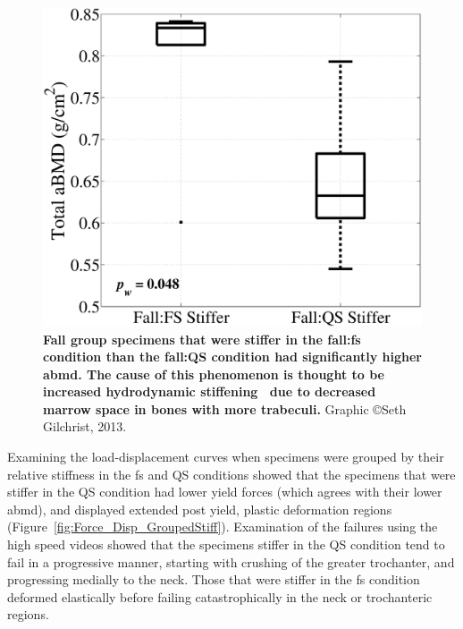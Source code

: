 \begin{figure}
\centering
\includegraphics[width=\linewidth]{./behave_fail/Figures/DXA_DeltaStiff}
\caption[\acs*{abmd} grouped by relative stiffness]{\textbf{Fall group specimens that were stiffer in the fall:\ac{fs} condition than the fall:\ac{QS} condition had significantly higher \ac{abmd}. The cause of this phenomenon is thought to be increased hydrodynamic stiffening~\citep{carter_compressive_1977} due to decreased marrow space in bones with more trabeculi.} Graphic \copyright Seth Gilchrist, 2013.}
\label{fig:DXA_DeltaStiff}
\end{figure}

Examining the load-displacement curves when specimens were grouped by their relative stiffness in the \ac{fs} and \ac{QS} conditions showed that the specimens that were stiffer in the \ac{QS} condition had lower yield forces (which agrees with their lower \ac{abmd}), and displayed extended post yield, plastic deformation regions (Figure~\ref{fig:Force_Disp_GroupedStiff}).
Examination of the failures using the high speed videos showed that the specimens stiffer in the \ac{QS} condition tend to fail in a progressive manner, starting with crushing of the greater trochanter, and progressing medially to the neck.
Those that were stiffer in the \ac{fs} condition deformed elastically before failing catastrophically in the neck or trochanteric regions.


